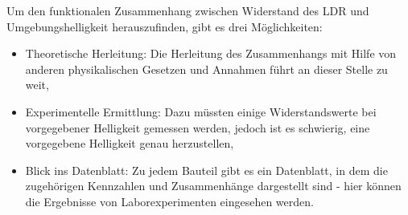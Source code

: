 
\bigskip
Um den funktionalen Zusammenhang zwischen Widerstand des LDR und Umgebungshelligkeit herauszufinden, gibt es drei Möglichkeiten:
\begin{itemize}
	\item Theoretische Herleitung: Die Herleitung des Zusammenhangs mit Hilfe von anderen physikalischen Gesetzen und Annahmen führt an dieser Stelle zu weit,
	\item Experimentelle Ermittlung: Dazu müssten einige Widerstandswerte bei vorgegebener Helligkeit gemessen werden, jedoch ist es schwierig, eine vorgegebene Helligkeit genau herzustellen,
	\item Blick ins Datenblatt: Zu jedem Bauteil gibt es ein Datenblatt, in dem die zugehörigen Kennzahlen und Zusammenhänge dargestellt sind - hier können die Ergebnisse von Laborexperimenten eingesehen werden.
\end{itemize}
\bigskip

